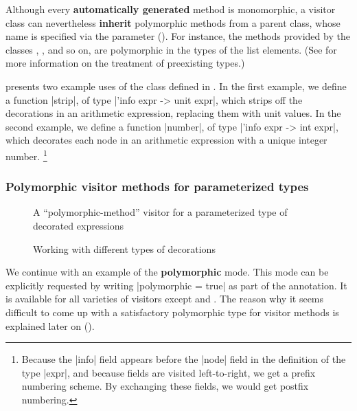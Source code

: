 \documentclass[11pt,a4paper,twoside]{article}
\renewcommand{\emph}[1]{\textbf{#1}}
\begin{document}
Although every \emph{automatically generated} method
is monomorphic, a visitor class can nevertheless \emph{inherit} polymorphic
methods from a parent class, whose name is specified via the \ancestors parameter
(). For instance, the  methods provided by
the classes , , and so on, are
polymorphic in the types of the list elements. (See 
for more information on the treatment of preexisting types.)

 presents two example uses of the class \map defined in
. In the first example, we define a function \oc|strip|, of
type \oc|'info expr -> unit expr|, which strips off the decorations in an
arithmetic expression, replacing them with unit values. In the second example,
we define a function \oc|number|, of type \oc|'info expr -> int expr|, which
decorates each node in an arithmetic expression with a unique integer number.%
\footnote{Because the \oc|info| field appears before the \oc|node| field in
  the definition of the type \oc|expr|, and because fields are visited
  left-to-right, we get a prefix numbering scheme. By exchanging these fields,
  we would get postfix numbering.} %


\subsubsection{Polymorphic visitor methods for parameterized types}
\label{sec:intro:parameterized:poly}

\begin{figure}[p]
\vspace{-\baselineskip}
\caption{A ``polymorphic-method'' visitor for a parameterized type of decorated expressions}
\label{fig:expr_info_polymorphic}
\end{figure}

\begin{figure}[p]
\caption{Working with different types of decorations}
\label{fig:expr_info_polymorphic_use}
\end{figure}

We continue with an example of the \emph{polymorphic} mode. This mode can be
explicitly requested by writing \oc|polymorphic = true| as part of the
\derivingvisitors annotation. It is available for all varieties of visitors
except \fold and \foldtwo. The reason why it seems difficult to come up with
a satisfactory polymorphic type for \fold visitor methods is explained later
on ().
\end{document}
